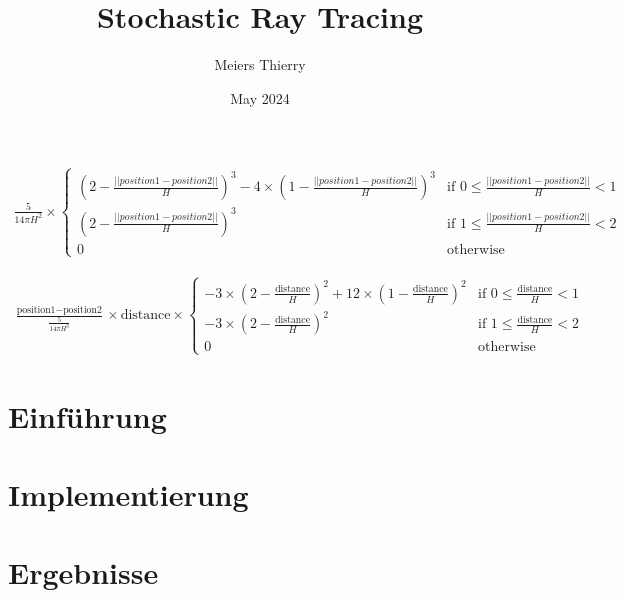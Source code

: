 \documentclass[a4paper, 12pt]{report}
\title{Stochastic Ray Tracing}
\author{Meiers Thierry}
\date{May 2024}
\begin{document}
\makeTitleAndTable

\begin{align*}
    \frac{5}{14\pi H^2} \times
    \begin{cases}
    (2 - \frac{||position1 - position2||}{H})^3 - 4 \times (1 - \frac{||position1 - position2||}{H})^3 & \text{if } 0 \leq \frac{||position1 - position2||}{H} < 1 \\
    (2 - \frac{||position1 - position2||}{H})^3 & \text{if } 1 \leq \frac{||position1 - position2||}{H} < 2 \\
    0 & \text{otherwise}
    \end{cases}
\end{align*}

\begin{align*}
    \frac{\text{position1} - \text{position2}}{\frac{5}{14\pi H^3}} \times \text{distance} \times
    \begin{cases}
    -3 \times (2 - \frac{\text{distance}}{H})^2 + 12 \times (1 - \frac{\text{distance}}{H})^2 & \text{if } 0 \leq \frac{\text{distance}}{H} < 1 \\
    -3 \times (2 - \frac{\text{distance}}{H})^2 & \text{if } 1 \leq \frac{\text{distance}}{H} < 2 \\
    0 & \text{otherwise}
    \end{cases}
\end{align*}

\chapter{Einführung}
\chapter{Implementierung}
\chapter{Ergebnisse}
\end{document}
